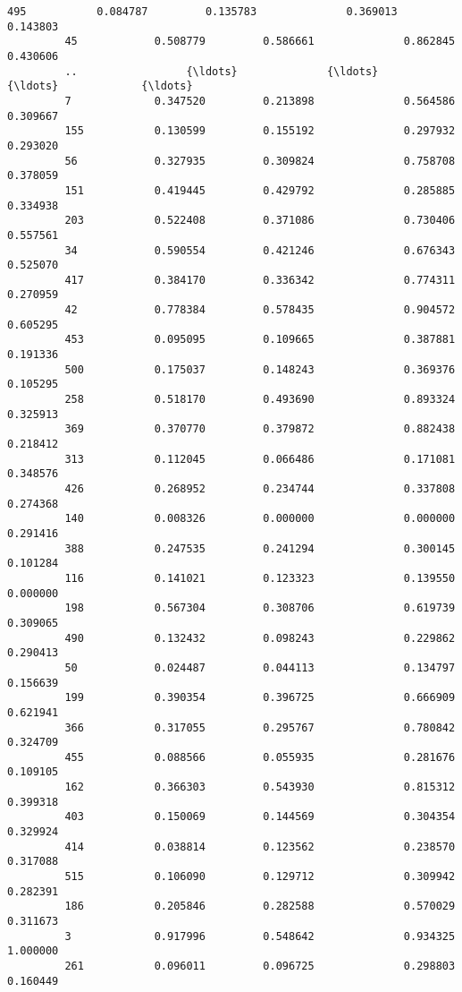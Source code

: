 \documentclass[11pt]{article}
\begin{document}
\begin{Verbatim}[commandchars=\\\{\}]
         495           0.084787         0.135783              0.369013        0.143803   
         45            0.508779         0.586661              0.862845        0.430606   
         ..                 {\ldots}              {\ldots}                   {\ldots}             {\ldots}   
         7             0.347520         0.213898              0.564586        0.309667   
         155           0.130599         0.155192              0.297932        0.293020   
         56            0.327935         0.309824              0.758708        0.378059   
         151           0.419445         0.429792              0.285885        0.334938   
         203           0.522408         0.371086              0.730406        0.557561   
         34            0.590554         0.421246              0.676343        0.525070   
         417           0.384170         0.336342              0.774311        0.270959   
         42            0.778384         0.578435              0.904572        0.605295   
         453           0.095095         0.109665              0.387881        0.191336   
         500           0.175037         0.148243              0.369376        0.105295   
         258           0.518170         0.493690              0.893324        0.325913   
         369           0.370770         0.379872              0.882438        0.218412   
         313           0.112045         0.066486              0.171081        0.348576   
         426           0.268952         0.234744              0.337808        0.274368   
         140           0.008326         0.000000              0.000000        0.291416   
         388           0.247535         0.241294              0.300145        0.101284   
         116           0.141021         0.123323              0.139550        0.000000   
         198           0.567304         0.308706              0.619739        0.309065   
         490           0.132432         0.098243              0.229862        0.290413   
         50            0.024487         0.044113              0.134797        0.156639   
         199           0.390354         0.396725              0.666909        0.621941   
         366           0.317055         0.295767              0.780842        0.324709   
         455           0.088566         0.055935              0.281676        0.109105   
         162           0.366303         0.543930              0.815312        0.399318   
         403           0.150069         0.144569              0.304354        0.329924   
         414           0.038814         0.123562              0.238570        0.317088   
         515           0.106090         0.129712              0.309942        0.282391   
         186           0.205846         0.282588              0.570029        0.311673   
         3             0.917996         0.548642              0.934325        1.000000   
         261           0.096011         0.096725              0.298803        0.160449   
         

\end{Verbatim}
\end{document}

